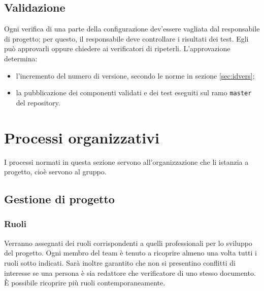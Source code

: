 \subsection{Validazione}
Ogni verifica di una parte della configurazione dev'essere vagliata dal responsabile di progetto; per questo, il responsabile deve controllare i risultati dei test. Egli può approvarli oppure chiedere ai verificatori di ripeterli. L'approvazione determina:
\begin{itemize}
	\item l'incremento del numero di versione, secondo le norme in sezione \ref{sec:idvers};
	\item la pubblicazione dei componenti validati e dei test eseguiti sul ramo \texttt{master} del repository.
\end{itemize}





\section{Processi organizzativi} \label{sec:organizzativi}
I processi normati in questa sezione servono all'organizzazione che li istanzia a progetto, cioè servono al gruppo.

\subsection{Gestione di progetto}

\subsubsection{Ruoli} \label{sec:ruoli}
Verranno assegnati dei ruoli corrispondenti a quelli professionali per lo sviluppo del progetto. Ogni membro del team è tenuto a ricoprire almeno una volta tutti i ruoli sotto indicati. Sarà inoltre garantito che non si presentino conflitti di interesse se una persona è sia redattore che verificatore di uno stesso documento. È possibile ricoprire più ruoli contemporaneamente.
